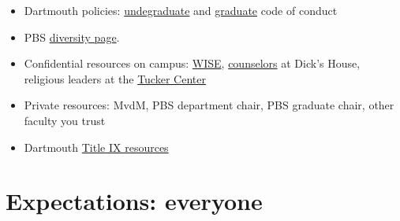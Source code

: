\documentclass{tufte-book}
\begin{document}
\begin{itemize}
\item{Dartmouth policies: \href{https://student-affairs.dartmouth.edu/policy/standards-conduct}{undegraduate} and \href{https://graduate.dartmouth.edu/policy/code-conduct-nonacademic-regulations}{graduate} code of conduct}
\item{PBS \href{https://pbs.dartmouth.edu/diversity}{diversity page}.}
\item{Confidential resources on campus:
  \href{http://www.wiseuv.org/dartmouth---home.html}{WISE},
  \href{https://students.dartmouth.edu/health-service/counseling/about/clinical-services/counseling}{counselors}
  at Dick's House, religious leaders at the
  \href{https://students.dartmouth.edu/tucker/about/pastoral-counseling}{Tucker
    Center}}
\item{Private resources: MvdM, PBS department chair, PBS graduate
  chair, other faculty you trust}
\item{Dartmouth \href{https://journeys.dartmouth.edu/knowyourrights/resources/}{Title IX resources}}
\end{itemize}

\section{Expectations: everyone}

\end{document}
